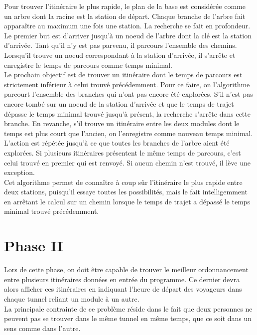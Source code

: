\documentclass[11pt, a4paper, twoside, titlepage]{article}
\begin{document}
Pour trouver l'itinéraire le plus rapide, le plan de la base est considérée comme un arbre dont la racine est la station de départ. Chaque branche de l'arbre fait apparaître au maximum une fois une station. La recherche se fait en profondeur.\\
Le premier but est d'arriver jusqu'à un noeud de l'arbre dont la clé est la station d'arrivée. Tant qu'il n'y est pas parvenu, il parcours l'ensemble des chemins. Lorsqu'il trouve un noeud correspondant à la station d'arrivée, il s'arrête et enregistre le temps de parcours comme temps minimal.\\
Le prochain objectif est de trouver un itinéraire dont le temps de parcours est strictement inférieur à celui trouvé précédemment. Pour ce faire, on l'algorithme parcourt l'ensemble des branches qui n'ont pas encore été explorées. S'il n'est pas encore tombé sur un noeud de la station d'arrivée et que le temps de trajet dépasse le temps minimal trouvé jusqu'à présent, la recherche s'arrête dans cette branche. En revanche, s'il trouve un itinéraire entre les deux modules dont le temps est plus court que l'ancien, on l'enregistre comme nouveau temps minimal.\\
L'action est répétée jusqu'à ce que toutes les branches de l'arbre aient été explorées.
Si plusieurs itinéraires présentent le même temps de parcours, c'est celui trouvé en premier qui est renvoyé. Si aucun chemin n'est trouvé, il lève une exception.\\

Cet algorithme permet de connaître à coup sûr l'itinéraire le plus rapide entre deux stations, puisqu'il essaye toutes les possibilités, mais le fait intelligemment en arrêtant le calcul sur un chemin lorsque le temps de trajet a dépassé le temps minimal trouvé précédemment.\\


\section{Phase II}

Lors de cette phase, on doit être capable de trouver le meilleur ordonnancement entre plusieurs itinéraires données en entrée du programme. Ce dernier devra alors afficher ces itinéraires en indiquant l'heure de départ des voyageurs dans chaque tunnel reliant un module à un autre.\\
La principale contrainte de ce problème réside dans le fait que deux personnes ne peuvent pas se trouver dans le même tunnel en même temps, que ce soit dans un sens comme dans l'autre.\\
\end{document}

